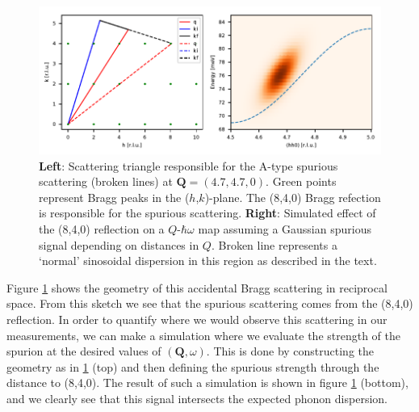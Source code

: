 \begin{figure}
    \centering
    \includegraphics[width=\textwidth]{fig/anomaly/spurion.pdf}
    \caption{\textbf{Left}: Scattering triangle responsible for the A-type spurious scattering (broken lines) at $\bm{Q} = (4.7,4.7,0)$. Green points represent Bragg peaks in the ($h$,$k$)-plane. The (8,4,0) Bragg refection is responsible for the spurious scattering. \textbf{Right}: Simulated effect of the (8,4,0) reflection on a $Q$-$\hbar\omega$ map assuming a Gaussian spurious signal depending on distances in $Q$. Broken line represents a `normal' sinosoidal dispersion in this region as described in the text.}
    \label{fig:in8_spurion}
\end{figure}

Figure \ref{fig:in8_spurion} shows the geometry of this accidental Bragg scattering in reciprocal space. From this sketch we see that the spurious scattering comes from the (8,4,0) reflection. In order to quantify where we would observe this scattering in our measurements, we can make a simulation where we evaluate the strength of the spurion at the desired values of $(\bm{Q}, \omega)$. This is done by constructing the geometry as in \ref{fig:in8_spurion} (top) and then defining the spurious strength through the distance to (8,4,0). The result of such a simulation is shown in figure \ref{fig:in8_spurion} (bottom), and we clearly see that this signal intersects the expected phonon dispersion.

